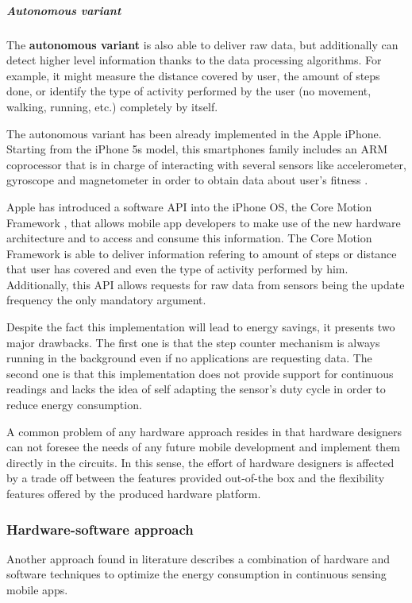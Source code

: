\subparagraph{Autonomous variant}
\label{subp:autonomous_variant}

The \textbf{autonomous variant} is also able to deliver raw data, but additionally can detect higher level information thanks to the data processing algorithms.
For example, it might measure the distance covered by user, the amount of steps done, or identify the type of activity performed by the user (no movement, walking, running, etc.) completely by itself.


The autonomous variant has been already implemented in the Apple iPhone.
Starting from the iPhone 5s model, this smartphones family includes an ARM coprocessor that is in charge of interacting with several sensors like accelerometer, gyroscope and magnetometer in order to obtain data about user's fitness \cite{Sathiah2013}.

Apple has introduced a software API into the iPhone OS, the Core Motion Framework \cite{Apple2015}, that allows mobile app developers to make use of the new hardware architecture and to access and consume this information.
The Core Motion Framework is able to deliver information refering to amount of steps or distance that user has covered and even the type of activity performed by him.
Additionally, this API allows requests for raw data from sensors being the update frequency the only mandatory argument.

Despite the fact this implementation will lead to energy savings, it presents two major drawbacks.
The first one is that the step counter mechanism is always running in the background even if no applications are requesting data.
The second one is that this implementation does not provide support for continuous readings and lacks the idea of self adapting the sensor's duty cycle in order to reduce energy consumption.

A common problem of any hardware approach resides in that hardware designers can not foresee the needs of any future mobile development and implement them directly in the circuits.
In this sense, the effort of hardware designers is affected by a trade off between the features provided out-of-the box and the flexibility features offered by the produced hardware platform.

\subsubsection{Hardware-software approach}

Another approach found in literature describes a combination of hardware and software techniques to optimize the energy consumption in continuous sensing mobile apps.

